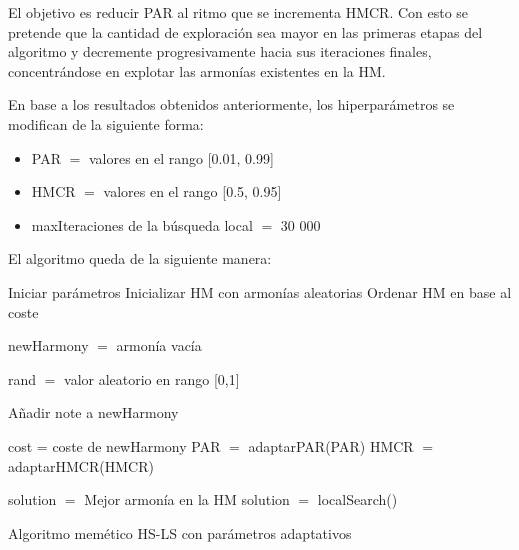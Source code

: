 \vspace{\baselineskip}

El objetivo es reducir PAR al ritmo que se incrementa HMCR. Con esto se pretende que la cantidad de exploración sea mayor en las primeras etapas del algoritmo y decremente progresivamente hacia sus iteraciones finales, concentrándose en explotar las armonías existentes en la HM.

\vspace{\baselineskip}

En base a los resultados obtenidos anteriormente, los hiperparámetros se modifican de la siguiente forma:
\begin{itemize}
    \item PAR $=$ valores en el rango [0.01, 0.99]
    \item HMCR $=$ valores en el rango [0.5, 0.95]
    \item maxIteraciones de la búsqueda local $=$ 30 000
\end{itemize}

\newpage

El algoritmo queda de la siguiente manera:
\vspace{\baselineskip}

\begin{algorithm}[H]
    \SetAlgoLined
        Iniciar parámetros \;
        Inicializar HM con armonías aleatorias \;
        Ordenar HM en base al coste \;
         {
            newHarmony $=$ armonía vacía \;
             {
                rand $=$ valor aleatorio en rango [0,1] \;
                

                Añadir note a newHarmony \;
            }
            cost = coste de newHarmony \;
            PAR $=$ adaptarPAR(PAR) \;
            HMCR $=$ adaptarHMCR(HMCR) \;
        }
        solution $=$ Mejor armonía en la HM \;
        solution $=$ localSearch() \;
    \caption{Algoritmo memético HS-LS con parámetros adaptativos}
\end{algorithm}